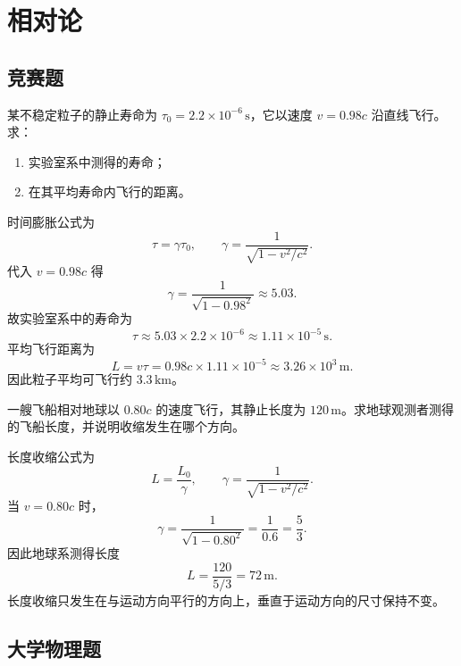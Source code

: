 \chapter{相对论}

\section{竞赛题}

\begin{competition}
某不稳定粒子的静止寿命为 $\tau_0=2.2\times 10^{-6}\,\mathrm{s}$，它以速度 $v=0.98c$ 沿直线飞行。求：
\begin{enumerate}
  \item 实验室系中测得的寿命；
  \item 在其平均寿命内飞行的距离。
\end{enumerate}
\begin{solution}
时间膨胀公式为
\[
\tau=\gamma \tau_0,
\qquad
\gamma=\frac{1}{\sqrt{1-v^2/c^2}}.
\]
代入 $v=0.98c$ 得
\[
\gamma=\frac{1}{\sqrt{1-0.98^2}}\approx 5.03.
\]
故实验室系中的寿命为
\[
\tau\approx 5.03\times 2.2\times 10^{-6}
\approx 1.11\times 10^{-5}\,\mathrm{s}.
\]
平均飞行距离为
\[
L=v\tau=0.98c\times 1.11\times 10^{-5}
\approx 3.26\times 10^3\,\mathrm{m}.
\]
因此粒子平均可飞行约 $3.3\,\mathrm{km}$。
\end{solution}
\end{competition}

\begin{competition}
一艘飞船相对地球以 $0.80c$ 的速度飞行，其静止长度为 $120\,\mathrm{m}$。求地球观测者测得的飞船长度，并说明收缩发生在哪个方向。
\begin{solution}
长度收缩公式为
\[
L=\frac{L_0}{\gamma},
\qquad
\gamma=\frac{1}{\sqrt{1-v^2/c^2}}.
\]
当 $v=0.80c$ 时，
\[
\gamma=\frac{1}{\sqrt{1-0.80^2}}=\frac{1}{0.6}=\frac{5}{3}.
\]
因此地球系测得长度
\[
L=\frac{120}{5/3}=72\,\mathrm{m}.
\]
长度收缩只发生在与运动方向平行的方向上，垂直于运动方向的尺寸保持不变。
\end{solution}
\end{competition}

\section{大学物理题}

